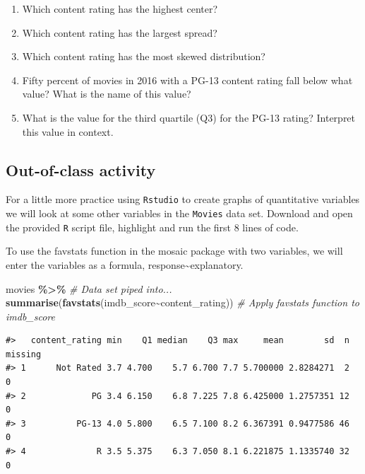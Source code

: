 \documentclass[
]{report}
\newenvironment{Shaded}{\begin{snugshade}}{\end{snugshade}}
\newcommand{\CommentTok}[1]{\textcolor[rgb]{0.56,0.35,0.01}{\textit{#1}}}
\newcommand{\KeywordTok}[1]{\textcolor[rgb]{0.13,0.29,0.53}{\textbf{#1}}}
\newcommand{\NormalTok}[1]{#1}
\newcommand{\OperatorTok}[1]{\textcolor[rgb]{0.81,0.36,0.00}{\textbf{#1}}}
\newcommand{\StringTok}[1]{\textcolor[rgb]{0.31,0.60,0.02}{#1}}
\begin{document}
\begin{enumerate}
\def\labelenumi{\alph{enumi}.}
\item
  Which content rating has the highest center?
  \vspace{0.2in}
\item
  Which content rating has the largest spread?
  \vspace{0.2in}
\item
  Which content rating has the most skewed distribution?
  \vspace{0.2in}
\item
  Fifty percent of movies in 2016 with a PG-13 content rating fall below what value? What is the name of this value?
  \vspace{0.4in}
\item
  What is the value for the third quartile (Q3) for the PG-13 rating? Interpret this value in context.
  \vspace{.8in}
\end{enumerate}

\hypertarget{out-of-class-activity-3}{%
\subsection{Out-of-class activity}\label{out-of-class-activity-3}}

For a little more practice using \texttt{Rstudio} to create graphs of quantitative variables we will look at some other variables in the \texttt{Movies} data set. Download and open the provided \texttt{R} script file, highlight and run the first 8 lines of code.

To use the favstats function in the mosaic package with two variables, we will enter the variables as a formula, response\textasciitilde explanatory.

\begin{Shaded}
\begin{Highlighting}[]
\NormalTok{movies }\OperatorTok{\%\textgreater{}\%}\StringTok{ }\CommentTok{\# Data set piped into...}
\StringTok{  }\KeywordTok{summarise}\NormalTok{(}\KeywordTok{favstats}\NormalTok{(imdb\_score}\OperatorTok{\textasciitilde{}}\NormalTok{content\_rating)) }\CommentTok{\# Apply favstats function to imdb\_score}
\end{Highlighting}
\end{Shaded}

\begin{verbatim}
#>   content_rating min    Q1 median    Q3 max     mean        sd  n missing
#> 1      Not Rated 3.7 4.700    5.7 6.700 7.7 5.700000 2.8284271  2       0
#> 2             PG 3.4 6.150    6.8 7.225 7.8 6.425000 1.2757351 12       0
#> 3          PG-13 4.0 5.800    6.5 7.100 8.2 6.367391 0.9477586 46       0
#> 4              R 3.5 5.375    6.3 7.050 8.1 6.221875 1.1335740 32       0
\end{verbatim}
\end{document}
